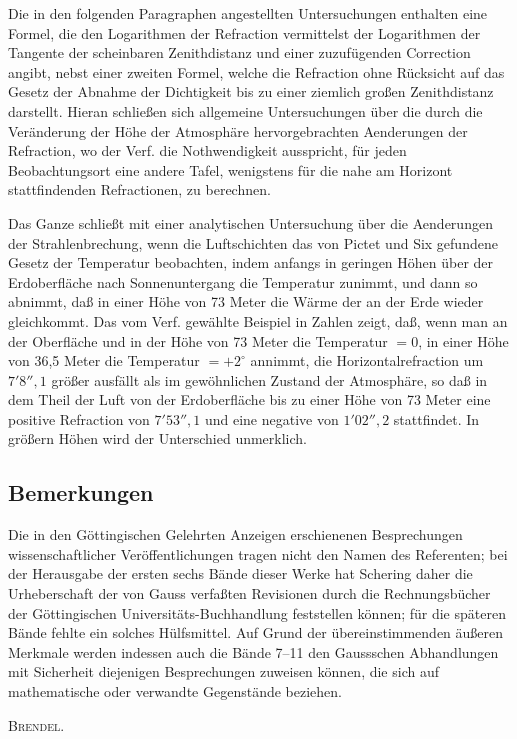 \documentclass[12pt,a4paper]{article}
\theoremstyle{plain}
\theoremstyle{definition}
\theoremstyle{remark}
\begin{document}
Die in den folgenden Paragraphen angestellten Untersuchungen enthalten eine Formel, die den Logarithmen der Refraction vermittelst der Logarithmen der Tangente der scheinbaren Zenithdistanz und einer zuzuf\"ugenden Correction angibt, nebst einer zweiten Formel, welche die Refraction ohne R\"ucksicht auf das Gesetz der Abnahme der Dichtigkeit bis zu einer ziemlich gro\ss en Zenithdistanz darstellt. Hieran schlie\ss en sich allgemeine Untersuchungen \"uber die durch die Ver\"anderung der H\"ohe der Atmosph\"are hervorgebrachten Aenderungen der Refraction, wo der Verf. die Nothwendigkeit ausspricht, f\"ur jeden Beobachtungsort eine andere Tafel, wenigstens f\"ur die nahe am Horizont stattfindenden Refractionen, zu berechnen.

Das Ganze schlie\ss t mit einer analytischen Untersuchung \"uber die Aenderungen der Strahlenbrechung, wenn die Luftschichten das von Pictet und Six gefundene Gesetz der Temperatur beobachten, indem anfangs in geringen H\"ohen \"uber der Erdoberfl\"ache nach Sonnenuntergang die Temperatur zunimmt, und dann so abnimmt, da\ss{} in einer H\"ohe von 73 Meter die W\"arme der an der Erde wieder gleichkommt. Das vom Verf. gew\"ahlte Beispiel in Zahlen zeigt, da\ss, wenn man an der Oberfl\"ache und in der H\"ohe von 73 Meter die Temperatur $= 0$, in einer H\"ohe von 36,5 Meter die Temperatur $= +2^{\circ}$ annimmt, die Horizontalrefraction um $7'8''{,}1$ gr\"o\ss er ausf\"allt als im gew\"ohnlichen Zustand der Atmosph\"are, so da\ss{} in dem Theil der Luft von der Erdoberfl\"ache bis zu einer H\"ohe von 73 Meter eine positive Refraction von $7'53''{,}1$ und eine negative von $1'02''{,}2$ stattfindet. In gr\"o\ss ern H\"ohen wird der Unterschied unmerklich.

\subsection*{Bemerkungen}

Die in den G\"ottingischen Gelehrten Anzeigen erschienenen Besprechungen wissenschaftlicher Ver\"offentlichungen tragen nicht den Namen des Referenten; bei der Herausgabe der ersten sechs B\"ande dieser Werke hat Schering daher die Urheberschaft der von Gauss verfa\ss ten Revisionen durch die Rechnungsb\"ucher der G\"ottingischen Universit\"ats-Buchhandlung feststellen k\"onnen; f\"ur die sp\"ateren B\"ande fehlte ein solches H\"ulfsmittel. Auf Grund der \"ubereinstimmenden \"au\ss eren Merkmale werden indessen auch die B\"ande 7--11 den Gaussschen Abhandlungen mit Sicherheit diejenigen Besprechungen zuweisen k\"onnen, die sich auf mathematische oder verwandte Gegenst\"ande beziehen.

\hfill\textsc{Brendel}.
\end{document}
